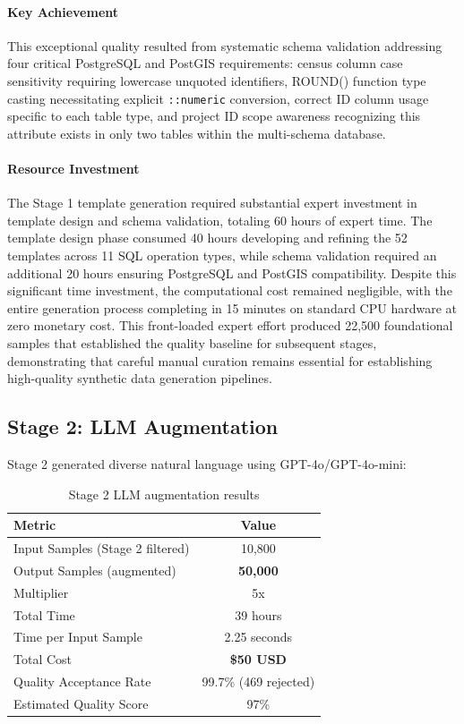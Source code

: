 \paragraph{Key Achievement}

This exceptional quality resulted from systematic schema validation addressing four critical PostgreSQL and PostGIS requirements: census column case sensitivity requiring lowercase unquoted identifiers, ROUND() function type casting necessitating explicit \texttt{::numeric} conversion, correct ID column usage specific to each table type, and project ID scope awareness recognizing this attribute exists in only two tables within the multi-schema database.

\paragraph{Resource Investment}

The Stage 1 template generation required substantial expert investment in template design and schema validation, totaling 60 hours of expert time. The template design phase consumed 40 hours developing and refining the 52 templates across 11 SQL operation types, while schema validation required an additional 20 hours ensuring PostgreSQL and PostGIS compatibility. Despite this significant time investment, the computational cost remained negligible, with the entire generation process completing in 15 minutes on standard CPU hardware at zero monetary cost. This front-loaded expert effort produced 22,500 foundational samples that established the quality baseline for subsequent stages, demonstrating that careful manual curation remains essential for establishing high-quality synthetic data generation pipelines.

\subsection{Stage 2: LLM Augmentation}

Stage 2 generated diverse natural language using GPT-4o/GPT-4o-mini:

\begin{table}%
\centering
\begin{tabular}{lc}
\toprule
\textbf{Metric} & \textbf{Value} \\
\midrule
Input Samples (Stage 2 filtered) & 10,800 \\
Output Samples (augmented) & \textbf{50,000} \\
Multiplier & 5x \\
Total Time & 39 hours \\
Time per Input Sample & 2.25 seconds \\
Total Cost & \textbf{\$50 USD} \\
Quality Acceptance Rate & 99.7\% (469 rejected) \\

Estimated Quality Score & 97\% \\
\bottomrule
\end{tabular}
\caption{Stage 2 LLM augmentation results}
\end{table}

